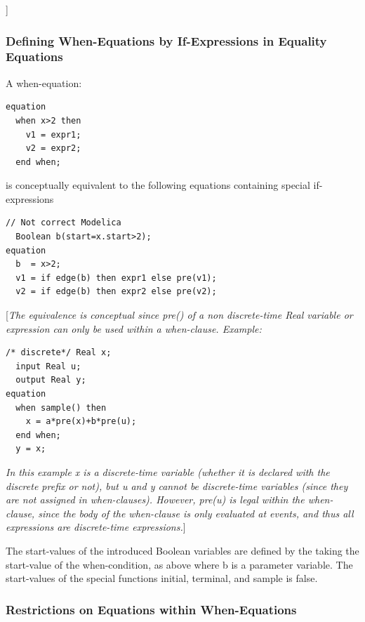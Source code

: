 \documentclass[10pt,a4paper]{report}
\def\doublelabel#1{\label{#1}}
\begin{document}
{]}

\subsubsection{Defining When-Equations by If-Expressions in Equality Equations}\doublelabel{defining-when-equations-by-if-expressions-in-equality-equations}

A when-equation:
\begin{lstlisting}[language=modelica]
equation
  when x>2 then
    v1 = expr1;
    v2 = expr2;   
  end when; 
\end{lstlisting}

is conceptually equivalent to the following equations containing special
if-expressions

\begin{lstlisting}[language=modelica]
  // Not correct Modelica    
  Boolean b(start=x.start>2);   
equation
  b  = x>2;
  v1 = if edge(b) then expr1 else pre(v1);
  v2 = if edge(b) then expr2 else pre(v2); 
\end{lstlisting}

{[}\emph{The equivalence is conceptual since pre() of a non
discrete-time Real variable or expression can only be used within a
when-clause. Example:}

\begin{lstlisting}[language=modelica]
  /* discrete*/ Real x;   
  input Real u;   
  output Real y;
equation
  when sample() then
    x = a*pre(x)+b*pre(u);
  end when;
  y = x;
\end{lstlisting}

\emph{In this example x is a discrete-time variable (whether it is
declared with the discrete prefix or not), but u and y cannot be
discrete-time variables (since they are not assigned in when-clauses).
However, pre(u) is legal within the when-clause, since the body of the
when-clause is only evaluated at events, and thus all expressions are
discrete-time expressions.}{]}

The start-values of the introduced Boolean variables are defined by the
taking the start-value of the when-condition, as above where b is a
parameter variable. The start-values of the special functions initial,
terminal, and sample is false.

\subsubsection{Restrictions on Equations within When-Equations}\doublelabel{restrictions-on-equations-within-when-equations}
\end{document}
